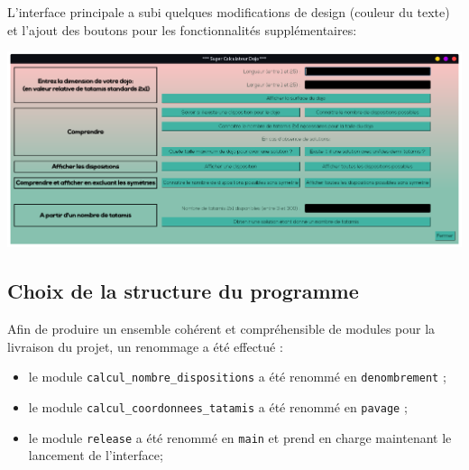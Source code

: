 L’interface principale a subi quelques modifications de design (couleur du texte) et l’ajout des boutons pour les
fonctionnalités supplémentaires:

\begin{center}
    \includegraphics[scale=0.25]{images/prodInterface.png}
\end{center}

\subsection{Choix de la structure du programme}


Afin de produire un ensemble cohérent et compréhensible de modules pour la livraison du projet, 
un renommage a été effectué :
\begin{itemize}
    \item le module \texttt{calcul\_nombre\_dispositions} a été renommé en \texttt{denombrement} ;
    \item le module \texttt{calcul\_coordonnees\_tatamis} a été renommé en \texttt{pavage} ;
    \item le module \texttt{release} a été renommé en \texttt{main} et prend en charge maintenant le lancement de l'interface;
\end{itemize}

